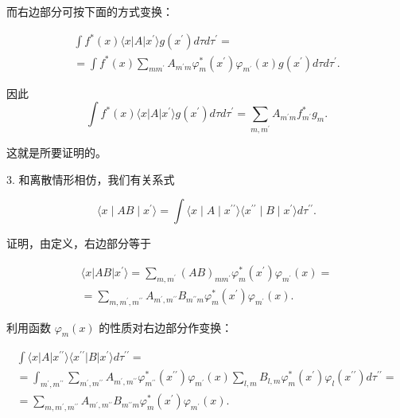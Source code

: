 而右边部分可按下面的方式变换：

\begin{equation*}
\begin{array}{l} \int f ^ {*} (x) \langle x | A | x ^ {\prime} \rangle g (x ^ {\prime}) d \tau d \tau^ {\prime} = \\ = \int f ^ {*} (x) \sum_ {m m ^ {\prime}} A _ {m ^ {\prime} m} \varphi_ {m} ^ {*} (x ^ {\prime}) \varphi_ {m ^ {\prime}} (x) g (x ^ {\prime}) d \tau d \tau^ {\prime}. \end{array}
\end{equation*}

因此
\begin{equation*}
\int f ^ {*} (x) \langle x | A | x ^ {\prime} \rangle g (x ^ {\prime}) d \tau d \tau^ {\prime} = \sum_ {m, m ^ {\prime}} A _ {m ^ {\prime} m} f _ {m ^ {\prime}} ^ {*} g _ {m}.
\end{equation*}

这就是所要证明的。

3. 和离散情形相仿，我们有关系式

\begin{equation*}
\langle x \mid A B \mid x ^ {\prime} \rangle = \int \langle x \mid A \mid x ^ {\prime \prime} \rangle \langle x ^ {\prime \prime} \mid B \mid x ^ {\prime} \rangle d \tau^ {\prime \prime}.\tag{5.18}
\end{equation*}

证明，由定义，右边部分等于

\begin{equation*}
\begin{array}{l} \langle x | A B | x ^ {\prime} \rangle = \sum_ {m, m ^ {\prime}} (A B) _ {m m ^ {\prime}} \varphi_ {m} ^ {*} (x ^ {\prime}) \varphi_ {m ^ {\prime}} (x) = \\ = \sum_ {m, m ^ {\prime}, m ^ {\prime \prime}} A _ {m ^ {\prime}, m ^ {\prime \prime}} B _ {m ^ {\prime \prime} m} \varphi_ {m} ^ {*} (x ^ {\prime}) \varphi_ {m ^ {\prime}} (x). \end{array}
\end{equation*}

利用函数 $\varphi_{m}(x)$ 的性质对右边部分作变换：

\begin{equation*}
\begin{array}{l} \int \langle x | A | x ^ {\prime \prime} \rangle \langle x ^ {\prime \prime} | B | x ^ {\prime} \rangle d \tau^ {\prime \prime} = \\ = \int_ {m ^ {\prime}, m ^ {\prime \prime}} \sum_ {m ^ {\prime}, m ^ {\prime \prime}} A _ {m ^ {\prime}, m ^ {\prime \prime}} \varphi_ {m ^ {\prime \prime}} ^ {*} (x ^ {\prime \prime}) \varphi_ {m ^ {\prime}} (x) \sum_ {l, m} B _ {l, m} \varphi_ {m} ^ {*} (x ^ {\prime}) \varphi_ {l} (x ^ {\prime \prime}) d \tau^ {\prime \prime} = \\ = \sum_ {m, m ^ {\prime}, m ^ {\prime \prime}} A _ {m ^ {\prime}, m ^ {\prime \prime}} B _ {m ^ {\prime \prime} m} \varphi_ {m} ^ {*} (x ^ {\prime}) \varphi_ {m ^ {\prime}} (x). \end{array}
\end{equation*}

